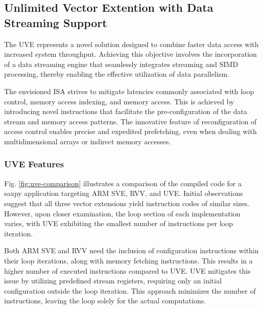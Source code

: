 \subsection{Unlimited Vector Extention with Data Streaming Support}
\label{label:uve}





The \acrfull{UVE} \cite{uve-paper} represents a novel solution designed to combine faster data access with increased system throughput. Achieving this objective involves the incorporation of a data streaming engine that seamlessly integrates streaming and SIMD processing, thereby enabling the effective utilization of data parallelism.

The envisioned \acrshort{ISA} strives to mitigate latencies commonly associated with loop control, memory access indexing, and memory access. This is achieved by introducing novel instructions that facilitate the pre-configuration of the data stream and memory access patterns. The innovative feature of reconfiguration of access control enables precise and expedited prefetching, even when dealing with multidimensional arrays or indirect memory accesses.


\subsubsection{UVE Features}


Fig. \ref{fig:uve-comparison} illustrates a comparison of the compiled code for a saxpy application targeting ARM SVE, RVV, and UVE. Initial observations suggest that all three vector extensions yield instruction codes of similar sizes. However, upon closer examination, the loop section of each implementation varies, with UVE exhibiting the smallest number of instructions per loop iteration.

Both ARM SVE and RVV need the inclusion of configuration instructions within their loop iterations, along with memory fetching instructions. This results in a higher number of executed instructions compared to UVE. UVE mitigates this issue by utilizing predefined stream registers, requiring only an initial configuration outside the loop iteration. This approach minimizes the number of instructions, leaving the loop solely for the actual computations.


